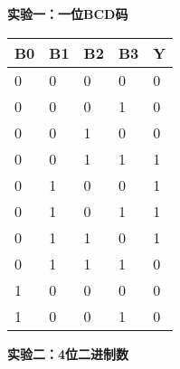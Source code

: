 \documentclass[a4paper,12pt]{article}
\begin{document}
\begin{table}[h]
    \begin{minipage}{0.48\textwidth}
        \centering
        \textbf{实验一：一位BCD码}
        \begin{tabular}{|l|l|l|l|l|}
            \hline
            \textbf{B0} & \textbf{B1} & \textbf{B2} & \textbf{B3} & \textbf{Y} \\ \hline
            0           & 0           & 0           & 0           & 0          \\ \hline
            0           & 0           & 0           & 1           & 0          \\ \hline
            0           & 0           & 1           & 0           & 0          \\ \hline
            0           & 0           & 1           & 1           & 1          \\ \hline
            0           & 1           & 0           & 0           & 1          \\ \hline
            0           & 1           & 0           & 1           & 1          \\ \hline
            0           & 1           & 1           & 0           & 1          \\ \hline
            0           & 1           & 1           & 1           & 0          \\ \hline
            1           & 0           & 0           & 0           & 0          \\ \hline
            1           & 0           & 0           & 1           & 0          \\ \hline
        \end{tabular}
    \end{minipage}
    \hfill
    \begin{minipage}{0.48\textwidth}
        \centering
        \textbf{实验二：4位二进制数}
        

\end{minipage}
\end{table}
\end{document}

